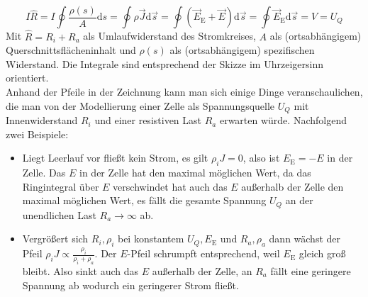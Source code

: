 \begin{equation}
	I\hat{R}=I\oint\frac{\rho(s)}{A}\mathrm{d}s=\oint\rho\vec J\mathrm{d}\vec s=\oint(\vec E_\mathrm{E} + \vec E)\mathrm{d}\vec s=\oint\vec E_\mathrm{E}\mathrm{d}\vec s=V=U_Q
\end{equation}
Mit $\hat{R}=R_i+R_a$ als Umlaufwiderstand des Stromkreises, $A$ als (ortsabhängigem) Querschnittsflächeninhalt und $\rho(s)$ als (ortsabhängigem) spezifischen Widerstand. Die Integrale sind entsprechend der Skizze im Uhrzeigersinn orientiert.\\
 Anhand der Pfeile in der Zeichnung kann man sich einige Dinge veranschaulichen, die man von der Modellierung einer Zelle als Spannungsquelle $U_Q$ mit Innenwiderstand $R_i$ und einer resistiven Last $R_a$ erwarten würde. Nachfolgend zwei Beispiele:
 \begin{itemize}
  \item Liegt Leerlauf vor fließt kein Strom, es gilt $\rho_i J = 0$, also ist $E_\mathrm{E}=-E$ in der Zelle. Das $E$ in der Zelle hat den maximal möglichen Wert, da das Ringintegral über $E$ verschwindet hat auch das $E$ außerhalb der Zelle den maximal möglichen Wert, es fällt die gesamte Spannung $U_Q$ an der unendlichen Last $R_a\to\infty$ ab. 
  \item Vergrößert sich $R_i,\rho_i$ bei konstantem $U_Q,E_\mathrm{E}$ und $R_a,\rho_a$ dann wächst der Pfeil $\rho_i J \propto \frac{\rho_i}{\rho_i+\rho_a}$. Der $E$-Pfeil schrumpft entsprechend, weil $E_\mathrm{E}$ gleich groß bleibt. Also sinkt auch das $E$ außerhalb der Zelle, an $R_a$ fällt eine geringere Spannung ab wodurch ein geringerer Strom fließt.
  \end{itemize}
